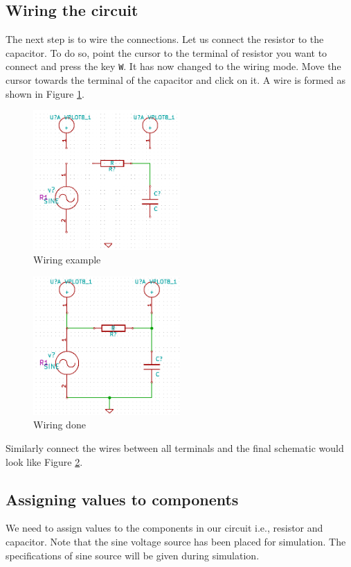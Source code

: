 \subsection{Wiring the circuit}
The next step is to wire the connections. Let us connect the resistor to the capacitor. To do so, point the cursor to the terminal of resistor you want to connect and press the key {\tt W}. It has now changed to the wiring mode. Move the cursor towards the terminal of the capacitor and click on it. A wire is formed as shown in Figure \ref{wire1}.
\begin{figure}
\centering
\includegraphics[width=0.5\textwidth]{figures/wire1}
\caption{Wiring example}
\label{wire1}
\end{figure}
\begin{figure}
\centering
\includegraphics[width=0.5\textwidth]{figures/wirefin}
\caption{Wiring done}
\label{wirefin}
\end{figure}


Similarly connect the wires between all terminals and the final schematic would look like Figure \ref{wirefin}.
\subsection{Assigning values to components}
We need to assign values to the components in our circuit i.e., resistor and capacitor. Note that the sine voltage source has been placed for simulation. The specifications of sine source will be given during simulation.

